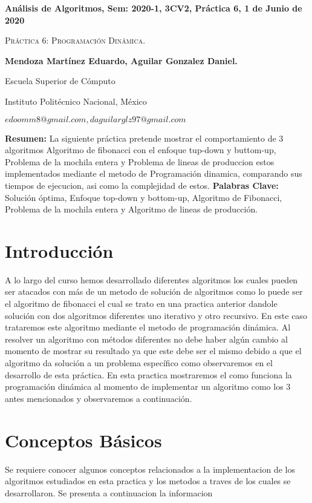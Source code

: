 \documentclass[12pt,twoside]{article}
\date{}
\begin{document}
\centerline{\bf An\'alisis de Algoritmos, Sem: 2020-1, 3CV2, Pr\'actica 6, 1 de Junio de 2020}
\centerline{}
\centerline{}
\begin{center}
\Large{\textsc{Práctica 6: Programación Dinámica.}}
\end{center}
\centerline{}
\centerline{\bf {Mendoza Mart\'inez Eduardo, Aguilar Gonzalez Daniel.}}
\centerline{}
\centerline{Escuela Superior de C\'omputo}
\centerline{Instituto Polit\'ecnico Nacional, M\'exico}
\centerline{$edoomm8@gmail.com, daguilarglz97@gmail.com$}
\newtheorem{Theorem}{\quad Theorem}[section]
\newtheorem{Definition}[Theorem]{\quad Definition}
\newtheorem{Corollary}[Theorem]{\quad Corollary}
\newtheorem{Lemma}[Theorem]{\quad Lemma}
\newtheorem{Example}[Theorem]{\quad Example}
\bigskip
\textbf{Resumen:} La siguiente práctica pretende mostrar el comportamiento de 3 algoritmos Algoritmo de fibonacci con el enfoque tup-down y buttom-up, Problema de la mochila entera y Problema de lineas de produccion estos implementados mediante el metodo de Programación dinamica, comparando sus tiempos de ejecuci\´on, as\´i como la complejidad de estos. \newline
{\bf Palabras Clave:} Solución óptima, Enfoque top-down y bottom-up, Algoritmo de Fibonacci, Problema de la mochila entera y Algoritmo de lineas de producción.

\section{Introducci\'on}
A lo largo del curso hemos desarrollado diferentes algoritmos los cuales pueden ser atacados con más de un metodo de solución de algoritmos como lo puede ser el algoritmo de fibonacci el cual se trato en una practica anterior dandole solución con dos algoritmos diferentes uno iterativo y otro recursivo. En este caso trataremos este algoritmo mediante el metodo de programación dinámica. Al resolver un algoritmo con métodos diferentes no debe haber algún cambio al momento de mostrar su resultado ya que este debe ser el mismo debido a que el algoritmo da solución a un problema específico como observaremos en el desarrollo de esta práctica.
En esta practica mostraremos el como funciona la programación dinámica al momento de implementar un algoritmo como los 3 antes mencionados y observaremos a continuación.

\section{Conceptos B\'asicos}
Se requiere conocer algunos conceptos relacionados
a la implementaci\´on de los algoritmos estudiados en esta pr\´actica y los
m\´etodos a trav\´es de los cuales se desarrollaron. Se presenta a continuaci\´on la informaci\´on
\end{document}

